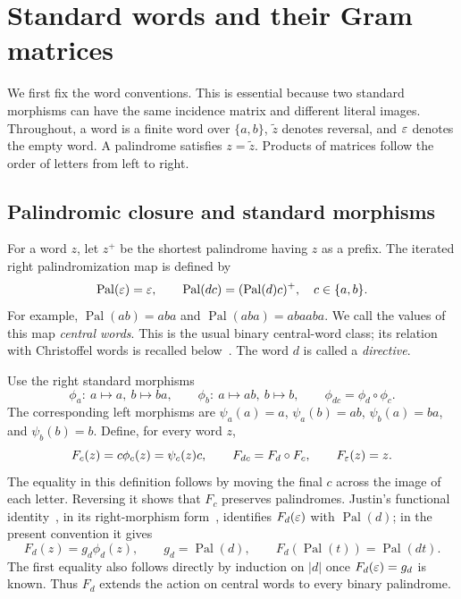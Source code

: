 \section{Standard words and their Gram matrices}
\label{sec:standard-grams}

We first fix the word conventions. This is essential because two
standard morphisms can have the same incidence matrix and different
literal images. Throughout, a word is a finite word over $\{a,b\}$,
$\widetilde z$ denotes reversal, and $\varepsilon$ denotes the empty word.
A palindrome satisfies $z=\widetilde z$. Products of matrices follow
the order of letters from left to right.

\subsection{Palindromic closure and standard morphisms}

For a word $z$, let $z^+$ be the shortest palindrome having $z$ as a
prefix. The iterated right palindromization map is defined by
$$
 \operatorname{Pal}(\varepsilon)=\varepsilon,\qquad
 \operatorname{Pal}(dc)=(\operatorname{Pal}(d)c)^+,
 \quad c\in\{a,b\}.
$$
For example, $\operatorname{Pal}(ab)=aba$ and
$\operatorname{Pal}(aba)=abaaba$. We call the values of this map
\emph{central words}. This is the usual binary central-word class;
its relation with Christoffel words is recalled below~\cite[Section~3]{BertheDeLucaReutenauer2008}.
The word $d$ is called a \emph{directive}.

Use the right standard morphisms
\begin{equation}\label{eq:right-standard}
 \phi_a:\ a\mapsto a,\ b\mapsto ba,
 \qquad
 \phi_b:\ a\mapsto ab,\ b\mapsto b,
 \qquad \phi_{dc}=\phi_d\circ\phi_c.
\end{equation}
The corresponding left morphisms are
$\psi_a(a)=a$, $\psi_a(b)=ab$, $\psi_b(a)=ba$, and
$\psi_b(b)=b$. Define, for every word $z$,
$$
 F_c(z)=c\phi_c(z)=\psi_c(z)c,\qquad
 F_{dc}=F_d\circ F_c,\qquad F_\varepsilon(z)=z.
$$
The equality in this definition follows by moving the final $c$
across the image of each letter. Reversing it shows that $F_c$
preserves palindromes. Justin's functional identity~\cite[Lemma~2.1]{Justin2005},
in its right-morphism form~\cite[Section~2]{PerrinReutenauer2023}, identifies
$F_d(\varepsilon)$ with $\operatorname{Pal}(d)$; in the present convention
it gives
\begin{equation}\label{eq:standard-palindrome-image}
 F_d(z)=g_d\phi_d(z),\qquad g_d=\operatorname{Pal}(d),
 \qquad F_d(\operatorname{Pal}(t))=\operatorname{Pal}(dt).
\end{equation}
The first equality also follows directly by induction on $|d|$
once $F_d(\varepsilon)=g_d$ is known. Thus $F_d$ extends the action on
central words to every binary palindrome.

